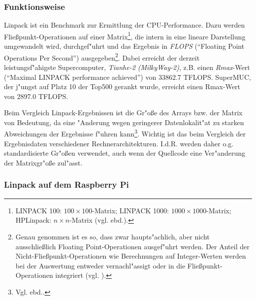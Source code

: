 


\subsubsection{Funktionsweise}\label{Funktionsweise Linpack}

Linpack ist ein Benchmark zur Ermittlung der CPU-Performance. Dazu werden Flie\ss punkt-Operationen auf einer Matrix\footnote{LINPACK 100: $100 \times 100$-Matrix; LINPACK 1000: $1000\times 1000$-Matrix; HPLinpack: $n\times n$-Matrix (vgl. ebd.).}, die intern in eine lineare Darstellung umgewandelt wird, durchgef"uhrt und das Ergebnis in \textit{FLOPS} ("`Floating Point Operations Per Second"') ausgegeben\footnote{Genau genommen ist es so, dass zwar haupts"achlich, aber nicht ausschlie\ss lich Floating Point-Operationen ausgef"uhrt werden. Der Anteil der Nicht-Flie\ss punkt-Operationen wie Berechnungen auf Integer-Werten werden bei der Auswertung entweder vernachl"assigt oder in die Flie\ss punkt-Operationen integriert (vgl. \cite{wei90}).}. Dabei erreicht der derzeit leistungsf"ahigste Supercomputer, \textit{Tianhe-2 (Milky\-Way-2)}, z.B. einen \textit{Rmax}-Wert ("`Maximal LINPACK performance achieved"') von 33862.7 TFLOPS. SuperMUC, der j"ungst auf Platz 10 der Top500 gerankt wurde, erreicht einen Rmax-Wert von 2897.0 TFLOPS.

Beim Vergleich Linpack-Ergebnissen ist die Gr"o\ss e des Arrays bzw. der Matrix von Bedeutung, da eine "Anderung wegen geringerer Datenlokalit"at zu starken Abweichungen der Ergebnisse f"uhren kann\footnote{Vgl. ebd..}. Wichtig ist das beim Vergleich der Ergebnisdaten verschiedener Rechnerarchitekturen. I.d.R. werden daher o.g. standardisierte Gr"o\ss en verwendet, auch wenn der Quellcode eine Ver"anderung der Matrixgr"o\ss e zul"asst. 

\subsubsection{Linpack auf dem Raspberry Pi}\label{Linpack RPi}

